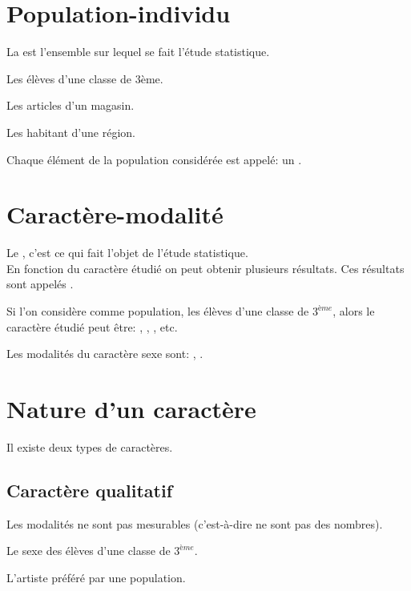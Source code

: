 \documentclass[12pt,a4paper]{report}
\begin{document}
\section{Population-individu}
La  est l'ensemble sur lequel se fait l'étude statistique.\\

\begin{exemples}
\item Les élèves d'une classe de 3ème.
\item Les articles d'un magasin.
\item Les habitant d'une région.
\end{exemples}

Chaque élément de la population considérée est appelé: un .

\section{Caractère-modalité}
Le , c'est ce qui fait l'objet de l'étude statistique.\\
En fonction du caractère étudié on peut obtenir plusieurs résultats. Ces résultats sont appelés .

\begin{exemples}
\item Si l'on considère comme population, les élèves d'une classe de $3^{ème}$, alors le caractère étudié peut être: , , , etc.
\item Les modalités du caractère sexe sont: , .
\end{exemples}

\section{Nature d'un caractère}
Il existe deux types de caractères.
\subsection{Caractère qualitatif}
Les modalités ne sont pas mesurables (c'est-à-dire ne sont pas des nombres).

\begin{exemples}
\item Le sexe des élèves d'une classe de $3^{ème}$.
\item L'artiste préféré par une population.
\end{exemples}
\end{document}
